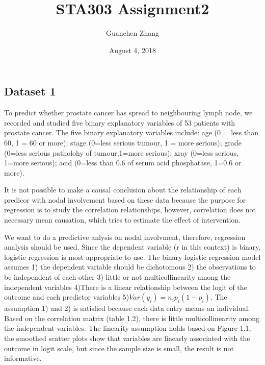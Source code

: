 \documentclass[]{article}
\title{STA303 Assignment2}
\author{Guanchen Zhang}
\date{August 4, 2018}
\begin{document}
\maketitle

\fontsize{12}{12}

\subsection{Dataset 1}\label{dataset-1}

To predict whether prostate cancer has spread to neighbouring lymph
node, we recorded and studied five binary explanatory variables of 53
patients with prostate cancer. The five binary explanatory variables
include: age (0 = less than 60, 1 = 60 or more); stage (0=less serious
tumour, 1 = more serious); grade (0=less serious patholohy of
tumour,1=more serious); xray (0=less serious, 1=more serious); acid
(0=less than 0.6 of serum acid phosphatase, 1=0.6 or more).

It is not possible to make a causal conclusion about the relationship of
each predicor with nodal involvement based on these data because the
purpose for regression is to study the correlation relationships,
however, correlation does not necessary mean causation, which tries to
estimate the effect of intervention.

We want to do a predictive anlysis on nodal involvment, therefore,
regression analysis should be used. Since the dependent variable (r in
this context) is binary, logistic regression is most appropriate to use.
The binary logistic regression model assumes 1) the dependent variable
should be dichotomous 2) the observations to be independent of each
other 3) little or not multicollinearity among the independent variables
4)There is a linear relationship between the logit of the outcome and
each predictor variables 5)\(Var(y_i) = n_ip_i(1-p_i)\). The assumption
1) and 2) is satisfied because each data entry means an individual.
Based on the correlation matrix (table 1.2), there is little
multicollinearity among the independent variables. The linearity
assumption holds based on Figure 1.1, the smoothed scatter plots show
that variables are linearly associated with the outcome in logit scale,
but since the sample size is small, the result is not informative.
\end{document}
